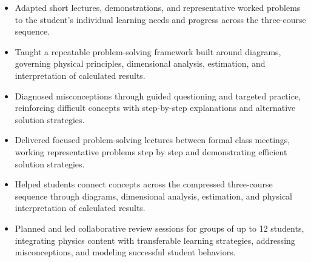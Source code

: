 \begin{itemize}
  \item Adapted short lectures, demonstrations, and representative worked problems to the student's individual learning needs and progress across the three-course sequence.
  \item Taught a repeatable problem-solving framework built around diagrams, governing physical principles, dimensional analysis, estimation, and interpretation of calculated results.
  \item Diagnosed misconceptions through guided questioning and targeted practice, reinforcing difficult concepts with step-by-step explanations and alternative solution strategies.
\end{itemize}

\begin{itemize}
  \item Delivered focused problem-solving lectures between formal class meetings, working representative problems step by step and demonstrating efficient solution strategies.
  \item Helped students connect concepts across the compressed three-course sequence through diagrams, dimensional analysis, estimation, and physical interpretation of calculated results.
  \item Planned and led collaborative review sessions for groups of up to 12 students, integrating physics content with transferable learning strategies, addressing misconceptions, and modeling successful student behaviors.
\end{itemize}
